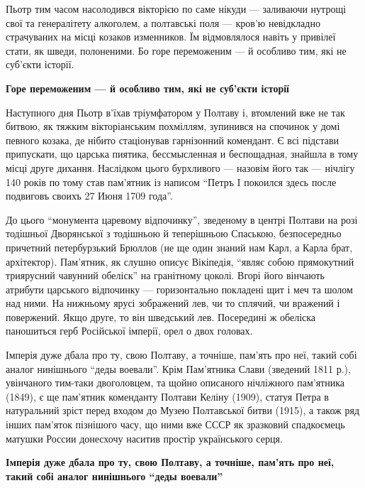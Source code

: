 Пьотр тим часом насолодився вікторією по саме нікуди --- заливаючи нутрощі свої
та генералітету алкоголем, а полтавські поля --- кров'ю невідкладно страчуваних
на місці козаков изменников. Їм відмовлялося навіть у привілеї стати, як шведи,
полоненими. Бо горе переможеним --- й особливо тим, які не суб'єкти історії.

\begin{leftbar}
	\bfseries
Горе переможеним --- й особливо тим, які не суб'єкти історії
\end{leftbar}

Наступного дня Пьотр в'їхав тріумфатором у Полтаву і, втомлений вже не так
битвою, як тяжким вікторіанським похміллям, зупинився на спочинок у домі
певного козака, де нібито стаціонував гарнізонний комендант. Є всі підстави
припускати, що царська пиятика, бессмысленная и беспощадная, знайшла в тому
місці друге дихання. Наслідком цього бурхливого --- назовім його так --- нічлігу
140 років по тому став пам'ятник із написом \enquote{Петръ I покоился здесь после
подвиговъ своихъ 27 Июня 1709 года}.

До цього \enquote{монумента царевому відпочинку}, зведеному в центрі Полтави на розі
тодішньої Дворянської з тодішньою й теперішньою Спаською, безпосередньо
причетний петербурзький Брюллов (не ще один знаний нам Карл, а Карла брат,
архітектор). Пам'ятник, як слушно описує Вікіпедія, \enquote{являє собою прямокутний
триярусний чавунний обеліск} на гранітному цоколі. Вгорі його вінчають атрибути
царського відпочинку --- горизонтально покладені щит і меч та шолом над ними. На
нижньому ярусі зображений лев, чи то сплячий, чи вражений і повержений. Якщо
друге, то він шведський лев. Посередині ж обеліска паношиться герб Російської
імперії, орел о двох головах.

Імперія дуже дбала про ту, свою Полтаву, а точніше, пам'ять про неї, такий собі
аналог нинішнього \enquote{деды воевали}. Крім Пам'ятника Слави (зведений 1811 р.),
увінчаного тим-таки двоголовцем, та щойно описаного нічліжного пам'ятника
(1849), є ще пам'ятник коменданту Полтави Келіну (1909), статуя Петра в
натуральний зріст перед входом до Музею Полтавської битви (1915), а також ряд
інших пам'яток пізнішого часу, що ними вже СССР як зразковий спадкоємець
матушки России донесхочу наситив простір українського серця.

\begin{leftbar}
	\bfseries
Імперія дуже дбала про ту, свою Полтаву, а точніше, пам'ять про неї, такий собі
аналог нинішнього \enquote{деды воевали}
\end{leftbar}

